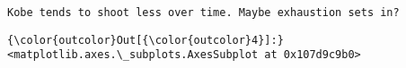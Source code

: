 \documentclass[11pt]{article}
\begin{document}
    \begin{Verbatim}[commandchars=\\\{\}]
Kobe tends to shoot less over time. Maybe exhaustion sets in?

    \end{Verbatim}

\begin{Verbatim}[commandchars=\\\{\}]
{\color{outcolor}Out[{\color{outcolor}4}]:} <matplotlib.axes.\_subplots.AxesSubplot at 0x107d9c9b0>
\end{Verbatim}
            
    \begin{center}
    \end{center}
    { \hspace*{\fill} \\}
    
\end{document}
